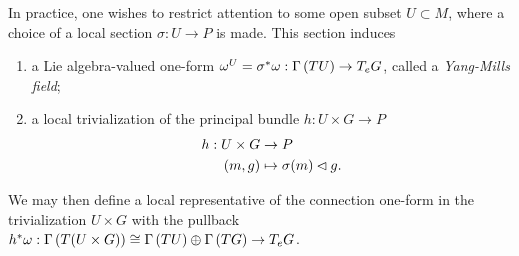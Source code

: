 In practice, one wishes to restrict attention to some open subset \(U \subset M\), where a choice of a local section \(\sigma : U \to P\) is made. This section induces
\begin{enumerate}[label=(\alph*)]
    \item a Lie algebra-valued one-form \(\omega^U = {\sigma}^{\ast}_{}{\omega} : \Gamma\left(TU\right) \to T_eG\), called a \emph{Yang-Mills field};
    \item a local trivialization of the principal bundle \(h : U \times G \to P\)
        \begin{align*}
            h : U \times G &\to P\\
                     (m,g) &\mapsto \sigma(m) \mathbin{\vartriangleleft} g.
        \end{align*}
\end{enumerate}
We may then define a local representative of the connection one-form in the trivialization \(U \times G\) with the pullback \({h}^{\ast}_{}{\omega} : \Gamma\left(T(U\times G)\right) \cong \Gamma\left(TU\right) \oplus \Gamma\left(TG\right) \to T_eG\).

